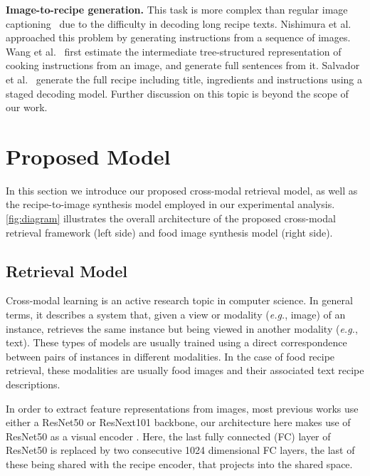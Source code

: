 \documentclass[sigconf,nonacm]{acmart}
\def\eg{\emph{e.g.}} \def\Eg{\emph{E.g.}}
\begin{document}
\noindent\textbf{Image-to-recipe generation.}
This task is more 
complex
than regular image captioning~\cite{Vinyals2015,Karpathy2017} 
due to
the difficulty in decoding long recipe texts. Nishimura et al.~\cite{Nishimura1,Nishimura2} approached this problem by generating instructions from a sequence of images. Wang et al.~\cite{wang_eccv20} first estimate the intermediate tree-structured representation of cooking instructions from an image, and generate full sentences from it. Salvador et al.~\cite{salvador_2019} generate the full recipe including title, ingredients and instructions using a staged decoding model. Further discussion on this topic is beyond the scope of our work.

\section{Proposed Model}
In this section we introduce our proposed cross-modal retrieval model, as well as the recipe-to-image synthesis model employed in our experimental analysis. \autoref{fig:diagram} illustrates the overall architecture of the proposed cross-modal retrieval framework (left side) and food image synthesis model (right side).

\subsection{Retrieval Model}

Cross-modal learning is an active research topic in computer science. In general terms, it describes a system that, given a view or modality (\eg, image) of an instance, retrieves the same instance but being viewed in another modality (\eg, text). 
These types of models are usually trained using a direct correspondence between pairs of instances in different modalities. In the case of food recipe retrieval, these modalities are usually food images and their associated text recipe descriptions.

In order to extract feature representations from images, most previous works use either a ResNet50 or ResNext101 backbone, our architecture here makes use of ResNet50 as a visual encoder . Here, the last fully connected (FC) layer of ResNet50 is replaced by two consecutive 1024 dimensional FC layers, the last of these being shared with the recipe encoder, that projects into the shared space.
\end{document}
